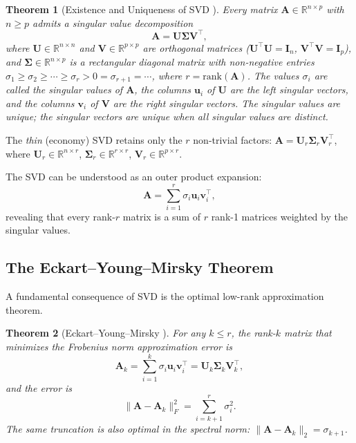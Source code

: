\documentclass[conference]{IEEEtran}
\newtheorem{theorem}{Theorem}
\begin{document}
\begin{theorem}[Existence and Uniqueness of SVD \cite{golub2013}]
Every matrix $\mathbf{A} \in \mathbb{R}^{n \times p}$ with $n \geq p$ admits a \emph{singular value decomposition}
\begin{equation}
\mathbf{A} = \mathbf{U}\mathbf{\Sigma}\mathbf{V}^\top,
\label{eq:svd}
\end{equation}
where $\mathbf{U} \in \mathbb{R}^{n \times n}$ and $\mathbf{V} \in \mathbb{R}^{p \times p}$ are orthogonal matrices ($\mathbf{U}^\top\mathbf{U} = \mathbf{I}_n$, $\mathbf{V}^\top\mathbf{V} = \mathbf{I}_p$), and $\mathbf{\Sigma} \in \mathbb{R}^{n \times p}$ is a rectangular diagonal matrix with non-negative entries $\sigma_1 \geq \sigma_2 \geq \cdots \geq \sigma_r > 0 = \sigma_{r+1} = \cdots$, where $r = \mathrm{rank}(\mathbf{A})$. The values $\sigma_i$ are called the \emph{singular values} of $\mathbf{A}$, the columns $\mathbf{u}_i$ of $\mathbf{U}$ are the \emph{left singular vectors}, and the columns $\mathbf{v}_i$ of $\mathbf{V}$ are the \emph{right singular vectors}. The singular values are unique; the singular vectors are unique when all singular values are distinct.
\end{theorem}

The \emph{thin} (economy) SVD retains only the $r$ non-trivial factors: $\mathbf{A} = \mathbf{U}_r \mathbf{\Sigma}_r \mathbf{V}_r^\top$, where $\mathbf{U}_r \in \mathbb{R}^{n \times r}$, $\mathbf{\Sigma}_r \in \mathbb{R}^{r \times r}$, $\mathbf{V}_r \in \mathbb{R}^{p \times r}$.

The SVD can be understood as an outer product expansion:
\begin{equation}
\mathbf{A} = \sum_{i=1}^{r} \sigma_i \mathbf{u}_i \mathbf{v}_i^\top,
\label{eq:svd_outer}
\end{equation}
revealing that every rank-$r$ matrix is a sum of $r$ rank-1 matrices weighted by the singular values.

\subsection{The Eckart--Young--Mirsky Theorem}

A fundamental consequence of SVD is the optimal low-rank approximation theorem.

\begin{theorem}[Eckart--Young--Mirsky \cite{eckart1936}]
For any $k \leq r$, the rank-$k$ matrix that minimizes the Frobenius norm approximation error is
\begin{equation}
\mathbf{A}_k = \sum_{i=1}^{k} \sigma_i \mathbf{u}_i \mathbf{v}_i^\top = \mathbf{U}_k \mathbf{\Sigma}_k \mathbf{V}_k^\top,
\end{equation}
and the error is
\begin{equation}
\|\mathbf{A} - \mathbf{A}_k\|_F^2 = \sum_{i=k+1}^{r} \sigma_i^2.
\label{eq:ey_error}
\end{equation}
The same truncation is also optimal in the spectral norm: $\|\mathbf{A} - \mathbf{A}_k\|_2 = \sigma_{k+1}$.
\end{theorem}
\end{document}
